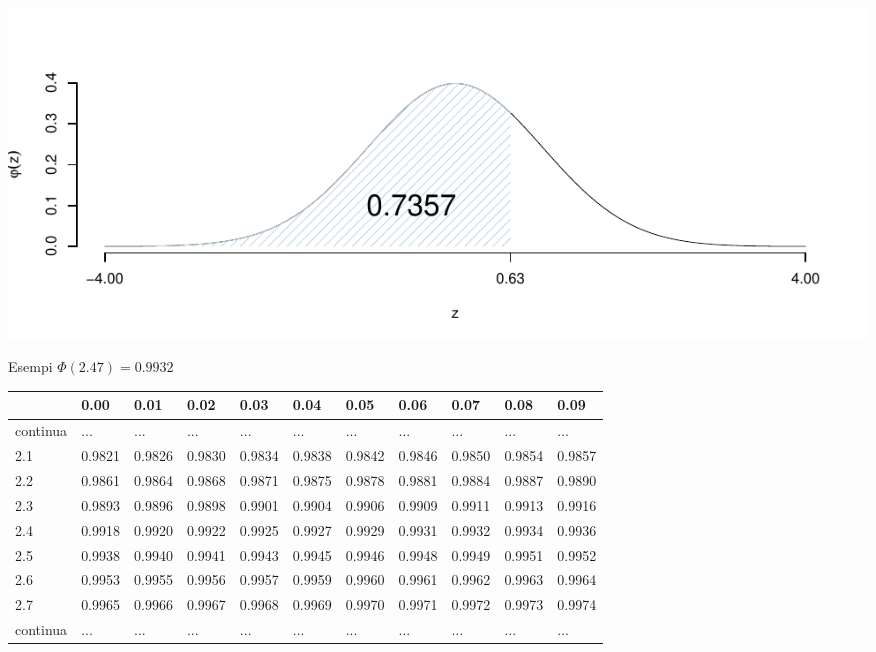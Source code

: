 \documentclass[
  11pt,
]{book}
\theoremstyle{mytheoremstyle}
\theoremstyle{mydefstyle}
\begin{document}
\begin{center}\includegraphics{Appunti_di_Statistica_2025_files/figure-latex/07c-Normale-13,-1} \end{center}

Esempi \(\Phi(2.47)=0.9932\)

\begin{tabular}{llllllll|>{}l|ll}
\toprule
  & 0.00 & 0.01 & 0.02 & 0.03 & 0.04 & 0.05 & 0.06 & 0.07 & 0.08 & 0.09\\
\midrule
continua & ... & ... & ... & ... & ... & ... & ... & \textcolor[HTML]{AB292E}{...} & ... & \vphantom{1} ...\\
2.1 & 0.9821 & 0.9826 & 0.9830 & 0.9834 & 0.9838 & 0.9842 & 0.9846 & \textcolor[HTML]{AB292E}{0.9850} & 0.9854 & 0.9857\\
2.2 & 0.9861 & 0.9864 & 0.9868 & 0.9871 & 0.9875 & 0.9878 & 0.9881 & \textcolor[HTML]{AB292E}{0.9884} & 0.9887 & 0.9890\\
2.3 & 0.9893 & 0.9896 & 0.9898 & 0.9901 & 0.9904 & 0.9906 & 0.9909 & \textcolor[HTML]{AB292E}{0.9911} & 0.9913 & 0.9916\\
\midrule
\textcolor[HTML]{AB292E}{2.4} & \textcolor[HTML]{AB292E}{0.9918} & \textcolor[HTML]{AB292E}{0.9920} & \textcolor[HTML]{AB292E}{0.9922} & \textcolor[HTML]{AB292E}{0.9925} & \textcolor[HTML]{AB292E}{0.9927} & \textcolor[HTML]{AB292E}{0.9929} & \textcolor[HTML]{AB292E}{0.9931} & \textcolor[HTML]{AB292E}{0.9932} & \textcolor[HTML]{AB292E}{0.9934} & \textcolor[HTML]{AB292E}{0.9936}\\
\midrule
2.5 & 0.9938 & 0.9940 & 0.9941 & 0.9943 & 0.9945 & 0.9946 & 0.9948 & \textcolor[HTML]{AB292E}{0.9949} & 0.9951 & 0.9952\\
2.6 & 0.9953 & 0.9955 & 0.9956 & 0.9957 & 0.9959 & 0.9960 & 0.9961 & \textcolor[HTML]{AB292E}{0.9962} & 0.9963 & 0.9964\\
2.7 & 0.9965 & 0.9966 & 0.9967 & 0.9968 & 0.9969 & 0.9970 & 0.9971 & \textcolor[HTML]{AB292E}{0.9972} & 0.9973 & 0.9974\\
continua & ... & ... & ... & ... & ... & ... & ... & \textcolor[HTML]{AB292E}{...} & ... & ...\\
\bottomrule
\end{tabular}
\end{document}
